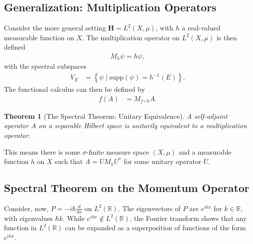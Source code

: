 \documentclass[10pt]{extarticle}
\newcommand{\R}{\mathbb{R}}
\newcommand{\set}[1]{\left\{#1\right\}}
\theoremstyle{plain}
\newtheorem*{theorem}{Theorem}%
\theoremstyle{definition}
\theoremstyle{remark}
\renewcommand{\newline}{\hfill\break}
\begin{document}
  \subsection{Generalization: Multiplication Operators}%
  Consider the more general setting $\mathbf{H} = L^{2}(X,\mu)$, with $h$ a real-valued measurable function on $X$. The multiplication operator on $L^{2}(X,\mu)$ is then defined
  \begin{align*}
    M_h\psi = h\psi,
  \end{align*}
  with the spectral subspaces
  \begin{align*}
    V_E &= \set{\psi\mid \text{supp}(\psi) = h^{-1}(E)}.
  \end{align*}
  The functional calculus can then be defined by
  \begin{align*}
    f(A) &= M_{f\circ h}A.
  \end{align*}
  \begin{theorem}[The Spectral Theorem: Unitary Equivalence]
    A self-adjoint operator $A$ on a separable Hilbert space is unitarily equivalent to a multiplication operator.
  \end{theorem}
  This means there is some $\sigma$-finite measure space $(X,\mu)$ and a measurable function $h$ on $X$ such that $A = UM_hU^{\ast}$ for some unitary operator $U$.
  \subsection{Spectral Theorem on the Momentum Operator}%
  Consider, now, $P = -i\hbar \frac{d }{dx}$ on $L^{2}(\R)$. The eigenvectors of $P$ are $e^{ikx}$ for $k\in \R$, with eigenvalues $\hbar k$. While $e^{ikx}\notin L^{2}(\R)$, the Fourier transform shows that any function in $L^{2}(\R)$ can be expanded as a superposition of functions of the form $e^{ikx}$.\newline
\end{document}
